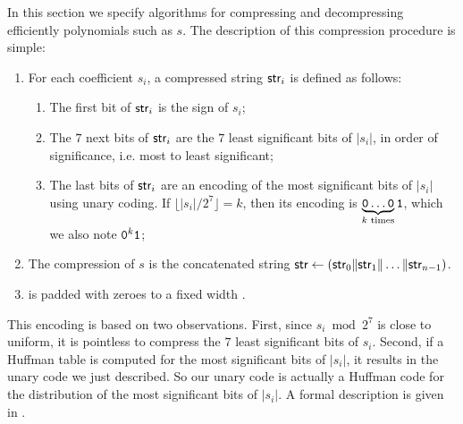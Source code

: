 In this section we specify algorithms for compressing and decompressing efficiently polynomials such as $s$. The description of this compression procedure is simple:
\begin{enumerate}
 \item
 For each coefficient $s_i$, a compressed string $\textsf{str}_i$ is defined as follows:
 \begin{enumerate}
  \item The first bit of $\textsf{str}_i$ is the sign of $s_i$;
  \item The $7$ next bits of $\textsf{str}_i$ are the $7$ least significant bits of $|s_i|$, in order of significance, i.e. most to least significant;
  \item The last bits of $\textsf{str}_i$  are an encoding of the most significant bits of $|s_i|$ using unary coding. If $\lfloor|s_i|/2^7\rfloor = k$, then its encoding is $\underbrace{\tt{0\dots 0}}_{k \text{ times}} \tt 1$, which we also note ${{\tt 0}^k \tt 1}$; 
 \end{enumerate}
  \item 
 The compression of $s$ is the concatenated string $\textsf{str} \gets (\textsf{str}_0\|\textsf{str}_1\|\dots\|\textsf{str}_{n-1})$.
 
 \item 
 \str is padded with zeroes to a fixed width \slen.
\end{enumerate}
This encoding is based on two observations. First, since $s_i \bmod 2^7$ is close to uniform, it is pointless to compress the $7$ least significant bits of $s_i$. Second, if a Huffman table is computed for the most significant bits of $|s_i|$, it results in the unary code we just described. So our unary code is actually a Huffman code for the distribution of the most significant bits of $|s_i|$. A formal description is given in \longcompress.

